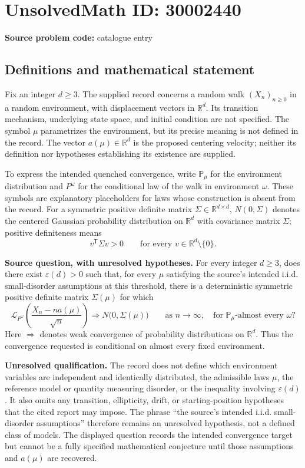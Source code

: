 \documentclass[11pt]{article}
\newcommand{\R}{\mathbb{R}}
\begin{document}
\section*{UnsolvedMath ID: 30002440}
\textbf{Source problem code:} catalogue entry
\subsection{Definitions and mathematical statement}
Fix an integer \(d\geq 3\). The supplied record concerns a random walk \((X_n)_{n\geq 0}\) in a random environment, with displacement vectors in \(\R^d\). Its transition mechanism, underlying state space, and initial condition are not specified. The symbol \(\mu\) parametrizes the environment, but its precise meaning is not defined in the record. The vector \(a(\mu)\in\R^d\) is the proposed centering velocity; neither its definition nor hypotheses establishing its existence are supplied.

To express the intended quenched convergence, write \(\mathbb P_\mu\) for the environment distribution and \(P^\omega\) for the conditional law of the walk in environment \(\omega\). These symbols are explanatory placeholders for laws whose construction is absent from the record. For a symmetric positive definite matrix \(\Sigma\in\R^{d\times d}\), \(N(0,\Sigma)\) denotes the centered Gaussian probability distribution on \(\R^d\) with covariance matrix \(\Sigma\); positive definiteness means
\[
v^{\mathsf T}\Sigma v>0\qquad\text{for every }v\in\R^d\setminus\{0\}.
\]

\textbf{Source question, with unresolved hypotheses.} For every integer \(d\geq 3\), does there exist \(\varepsilon(d)>0\) such that, for every \(\mu\) satisfying the source's intended i.i.d. small-disorder assumptions at this threshold, there is a deterministic symmetric positive definite matrix \(\Sigma(\mu)\) for which
\[
\mathcal L_{P^\omega}\!\left(\frac{X_n-na(\mu)}{\sqrt n}\right)
\Longrightarrow N\bigl(0,\Sigma(\mu)\bigr)
\qquad\text{as }n\to\infty,
\quad\text{for }\mathbb P_\mu\text{-almost every }\omega?
\]
Here \(\Longrightarrow\) denotes weak convergence of probability distributions on \(\R^d\). Thus the convergence requested is conditional on almost every fixed environment.

\textbf{Unresolved qualification.} The record does not define which environment variables are independent and identically distributed, the admissible laws \(\mu\), the reference model or quantity measuring disorder, or the inequality involving \(\varepsilon(d)\). It also omits any transition, ellipticity, drift, or starting-position hypotheses that the cited report may impose. The phrase ``the source's intended i.i.d. small-disorder assumptions'' therefore remains an unresolved hypothesis, not a defined class of models. The displayed question records the intended convergence target but cannot be a fully specified mathematical conjecture until those assumptions and \(a(\mu)\) are recovered.
\end{document}
